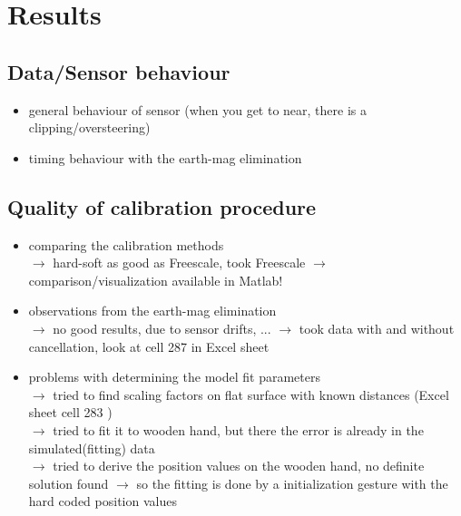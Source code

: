 \lhead[\chaptername~\thechapter]{\rightmark}

\rhead[\leftmark]{}

\lfoot[\thepage]{}

\cfoot{}

\rfoot[]{\thepage}

\chapter{Results} \label{cha:results}

\section{Data/Sensor behaviour} \label{sec:dataRes}

\begin{itemize}
\item general behaviour of sensor (when you get to near, there is a clipping/oversteering)
\item timing behaviour with the earth-mag elimination
\end{itemize}


\section{Quality of calibration procedure} \label{sec:cali}

\begin{itemize}
\item comparing the calibration methods \\
		$ \rightarrow $ hard-soft as good as Freescale, took Freescale
		$ \rightarrow $ comparison/visualization available in Matlab!
		
\item observations from the earth-mag elimination \\
		$ \rightarrow $ no good results, due to sensor drifts, ...
		$ \rightarrow $ took data with and without cancellation, look at cell 287 in Excel sheet 
		
\item problems with determining the model fit parameters \\
		$ \rightarrow $ tried to find scaling factors on flat surface with known distances (Excel sheet cell 283 ) \\
		$ \rightarrow $ tried to fit it to wooden hand, but there the error is already in the simulated(fitting) data \\
		$ \rightarrow $ tried to derive the position values on the wooden hand, no definite solution found
		$ \rightarrow $ so the fitting is done by a initialization gesture with the hard coded position values
		
\end{itemize}


